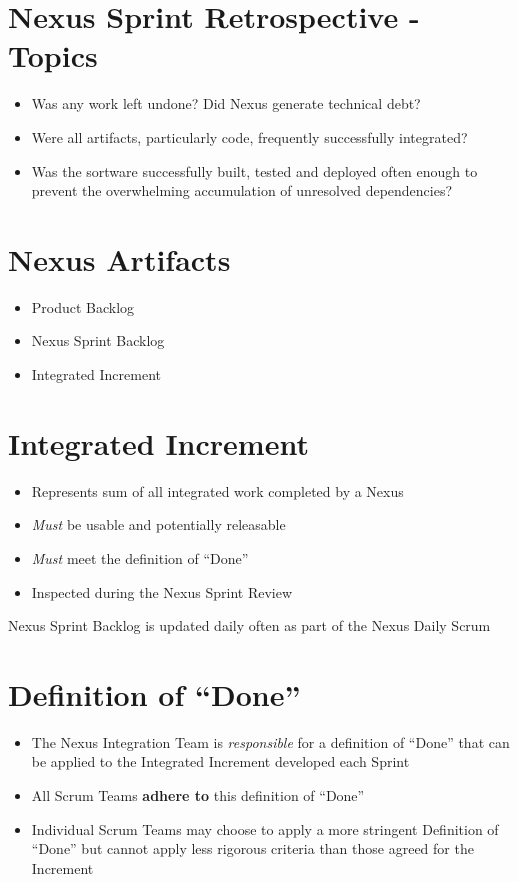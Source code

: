 \documentclass[a4paper,11pt,twocolumn]{article}
\begin{document}
\section*{Nexus Sprint Retrospective - Topics}
\begin{itemize}
	\item Was any work left undone? Did Nexus generate technical debt?
	\item Were all artifacts, particularly code, frequently successfully integrated?
	\item Was the sortware successfully built, tested and deployed often enough to prevent the overwhelming accumulation of unresolved dependencies?
\end{itemize}

\section*{Nexus Artifacts}
\begin{itemize}
	\item Product Backlog
	\item Nexus Sprint Backlog
	\item Integrated Increment
\end{itemize}

\section*{Integrated Increment}
\begin{itemize}
	\item Represents sum of all integrated work completed by a Nexus
	\item \textit{Must} be usable and potentially releasable
	\item \textit{Must} meet the definition of ``Done''
	\item Inspected during the Nexus Sprint Review
\end{itemize}

\begin{tcolorbox}[colback=black!8!white,colframe=gray!50!black,title=Note,sharp corners,fonttitle=\normalsize\bfseries,fontupper=\normalsize]
	Nexus Sprint Backlog is updated daily often as part of the Nexus Daily Scrum
\end{tcolorbox}

\section*{Definition of ``Done''}
\begin{itemize}
	\item The Nexus Integration Team is \textit{responsible} for a definition of ``Done'' that can be applied to the Integrated Increment developed each Sprint
	\item All Scrum Teams \textbf{adhere to} this definition of ``Done''
	\item Individual Scrum Teams may choose to apply a more stringent Definition of ``Done'' but cannot apply less rigorous criteria than those agreed for the Increment
\end{itemize}
\end{document}
